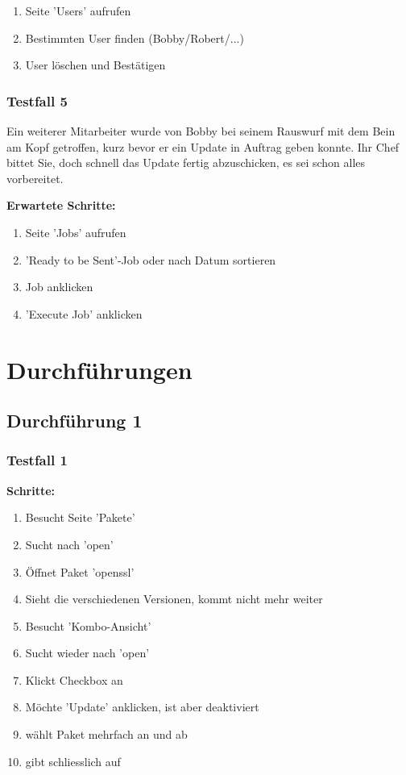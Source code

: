 \begin{enumerate}
    \item Seite 'Users' aufrufen
    \item Bestimmten User finden (Bobby/Robert/...)
    \item User löschen und Bestätigen
\end{enumerate}


\subsubsection*{Testfall 5}

Ein weiterer Mitarbeiter wurde von Bobby bei seinem Rauswurf mit dem Bein am Kopf getroffen, kurz bevor er ein Update in Auftrag geben konnte. Ihr Chef bittet Sie, doch schnell das Update fertig abzuschicken, es sei schon alles vorbereitet.

\bigskip
\textbf{Erwartete Schritte:}

\begin{enumerate}
    \item Seite 'Jobs' aufrufen
    \item 'Ready to be Sent'-Job oder nach Datum sortieren
    \item Job anklicken
    \item 'Execute Job' anklicken
\end{enumerate}





\section*{Durchführungen}



\subsection*{Durchführung 1}

\subsubsection*{Testfall 1}

\textbf{Schritte:}

\begin{enumerate}
    \item Besucht Seite 'Pakete'
    \item Sucht nach 'open'
    \item Öffnet Paket 'openssl'
    \item Sieht die verschiedenen Versionen, kommt nicht mehr weiter
    \item Besucht 'Kombo-Ansicht'
    \item Sucht wieder nach 'open'
    \item Klickt Checkbox an
    \item Möchte 'Update' anklicken, ist aber deaktiviert
    \item wählt Paket mehrfach an und ab
    \item gibt schliesslich auf
\end{enumerate}

